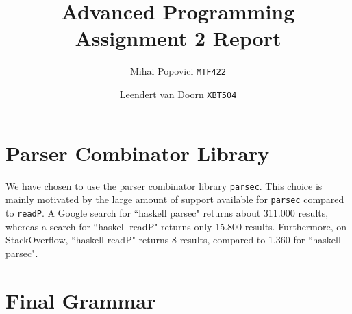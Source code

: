 \documentclass{article}
\title{Advanced Programming Assignment 2 Report}
\author{Mihai Popovici \texttt{MTF422} \and Leendert van Doorn \texttt{XBT504}}
\begin{document}
\maketitle




\section{Parser Combinator Library}
We have chosen to use the parser combinator library \texttt{parsec}. This choice is mainly motivated by the large amount of support available for \texttt{parsec} compared to \texttt{readP}. A Google search for ``haskell parsec" returns about 311.000 results, whereas a search for ``haskell readP" returns only 15.800 results. Furthermore, on StackOverflow, ``haskell readP" returns 8 results, compared to 1.360 for ``haskell parsec".

\section{Final Grammar}

\setlength{\grammarparsep}{4pt plus 1pt minus 1pt} %
\setlength{\grammarindent}{9em} %
\end{document}
